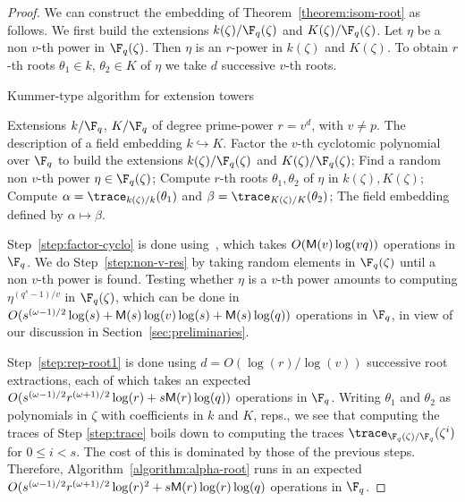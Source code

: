 \begin{proof}
We can construct the embedding of Theorem~\ref{theorem:isom-root} as
follows. We first build the extensions $k(\zeta) / \F_q(\zeta)$ and
$K(\zeta)/\F_q(\zeta)$. Let $\eta$ be a non $v$-th power in
$\F_q(\zeta)$.  Then $\eta$ is an $r$-power in $k(\zeta)$ and
$K(\zeta)$. To obtain $r$-th roots $\theta_1\in k$, $\theta_2\in K$ of
$\eta$ we take $d$ successive $v$-th roots.

\begin{algorithm}
  \caption{Kummer-type algorithm for extension towers}
	\label{algorithm:alpha-root}
	\begin{algorithmic}[1]
		\REQUIRE Extensions $k / \F_q$, $K/\F_q$ of degree prime-power $r = v^d$, with $v\ne p$.
		\ENSURE The description of a field embedding $k\hookrightarrow K$.
		\STATE\label{step:factor-cyclo} Factor the $v$-th cyclotomic polynomial over $\F_q$ to 
		build the extensions $k(\zeta) / \F_q(\zeta)$ and $K(\zeta)/\F_q(\zeta)$;
		\STATE\label{step:non-v-res} Find a random non $v$-th power $\eta \in \F_q(\zeta)$;
		\STATE\label{step:rep-root1} Compute $r$-th roots $\theta_1,\theta_2$ of $\eta$ in $k(\zeta),K(\zeta)$;
		\STATE\label{step:trace} Compute $\alpha = \trace_{k(\zeta) / k}(\theta_1)$ and $\beta = 
		\trace_{K(\zeta) / 
		K}(\theta_2)$;
		\RETURN The field embedding defined by $\alpha\mapsto\beta$.
	\end{algorithmic}
\end{algorithm}

Step~\ref{step:factor-cyclo} is done using~\cite[Theorem~9]{shoup94},
which takes $O(\mathsf{M}(v)\log(vq))$ operations in $\F_q$. We do
Step~\ref{step:non-v-res} by taking random elements in $\F_q(\zeta)$
until a non $v$-th power is found. Testing whether $\eta$ is a $v$-th power
amounts to computing $\eta^{(q^s-1)/v}$ in $\F_q(\zeta)$, which
can be done in $O(s^{(\omega-1)/2}\log(s) + \mathsf{M}(s)\log(v)\log(s) +
\mathsf{M}(s)\log(q))$ operations in $\F_q$, in view of our discussion in
Section~\ref{sec:preliminaries}.

Step~\ref{step:rep-root1} is done using $d = O(\log(r) / \log(v))$ successive root extractions, 
each of which takes an expected $O(s^{(\omega-1)/2}r^{(\omega+1)/2}\log(r) + s\mathsf{M}(r)\log(q))$
operations in $\F_q$. Writing $\theta_1$ and $\theta_2$ as polynomials in $\zeta$ with coefficients 
in $k$ and $K$, reps., we see that computing the traces of Step \ref{step:trace} boils down to 
computing the traces $\trace_{\F_q(\zeta) / \F_q}(\zeta^i)$ for $0 \le i < s$. The cost of this is 
dominated by those of the previous steps. Therefore, Algorithm~\ref{algorithm:alpha-root} runs in 
an expected $O(s^{(\omega-1)/2}r^{(\omega+1)/2}\log(r)^2 + s\mathsf{M}(r)\log(r)\log(q)$ operations in 
$\F_q$.
\end{proof}




